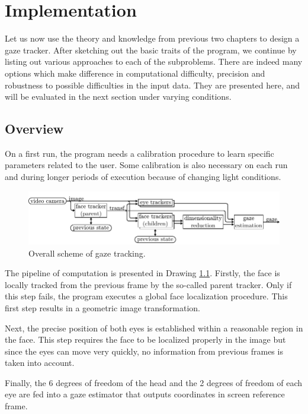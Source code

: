 \chapter{Implementation}
\label{s:impl}
Let us now use the theory and knowledge from previous two chapters to design a gaze tracker.
After sketching out the basic traits of the program, we continue by listing out various approaches to each of the subproblems.
There are indeed many options which make difference in computational difficulty, precision and robustness to possible difficulties in the input data.
They are presented here, and will be evaluated in the next section under varying conditions.

\section{Overview}

On a first run, the program needs a calibration procedure to learn specific parameters related to the user.
Some calibration is also necessary on each run and during longer periods of execution because of changing light conditions.

\begin{figure}[!ht]
	\centering 
	\centering \includegraphics{img/impl-overview.pdf}
	\caption{Overall scheme of gaze tracking.}\label{i:impl-overview}
\end{figure}

The pipeline of computation is presented in Drawing \ref{i:impl-overview}.
Firstly, the face is locally tracked from the previous frame by the so-called parent tracker.
Only if this step fails, the program executes a global face localization procedure.
This first step results in a geometric image transformation.

Next, the precise position of both eyes is established within a reasonable region in the face.
This step requires the face to be localized properly in the image but since the eyes can move very quickly, no information from previous frames is taken into account.

Finally, the 6 degrees of freedom of the head and the 2 degrees of freedom of each eye are fed into a gaze estimator that outputs coordinates in screen reference frame.

